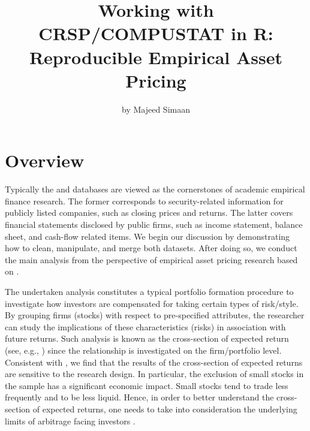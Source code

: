 
\title{Working with CRSP/COMPUSTAT in R: Reproducible Empirical Asset Pricing}
\author{by Majeed Simaan}

\maketitle




\hypertarget{overview}{%
\section{Overview}\label{overview}} 
Typically the \cite{CRSP} and \cite{COMPUSTAT} databases are viewed as the cornerstones of academic empirical finance research. The former corresponds to security-related information for publicly listed companies, such as closing prices and returns. The latter covers financial statements disclosed  by public firms, such as income statement, balance sheet, and cash-flow related items. We begin our discussion by demonstrating how to  clean, manipulate, and merge both datasets.  After doing so, we conduct the main analysis  from the perspective of empirical asset pricing research  based on  \cite{fama1993common}. 

The undertaken analysis constitutes  a typical portfolio formation procedure to investigate how investors are compensated for taking certain types of risk/style. 
 By grouping firms (stocks) with respect to pre-specified attributes, 
 the researcher can study the implications of these characteristics (risks) in association with  future returns. Such analysis is known as the cross-section of expected return
 (see, e.g., \cite{harvey2016and})  since the relationship is investigated on the firm/portfolio level. Consistent with \cite{harvey2016and}, we find that the results of the cross-section of expected returns are sensitive to the research design. In particular, the exclusion of small stocks in the sample has a significant economic impact. Small stocks tend to trade less frequently and to be less liquid. Hence, in order to better understand the cross-section of expected returns, one needs to take into consideration the underlying limits of arbitrage facing investors \citep{li2014limits}. 


